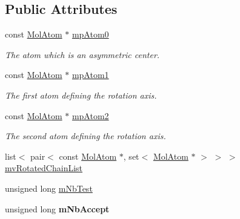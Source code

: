 \subsection*{Public Attributes}
\begin{DoxyCompactItemize}
\item 
\mbox{\label{struct_obj_cryst_1_1_molecule_1_1_flip_group_abb2dfdd1e7967f5963b0fc0fdc079b4f}} 
const \mbox{\hyperlink{class_obj_cryst_1_1_mol_atom}{Mol\+Atom}} $\ast$ \mbox{\hyperlink{struct_obj_cryst_1_1_molecule_1_1_flip_group_abb2dfdd1e7967f5963b0fc0fdc079b4f}{mp\+Atom0}}
\begin{DoxyCompactList}\small\item\em The atom which is an asymmetric center. \end{DoxyCompactList}\item 
\mbox{\label{struct_obj_cryst_1_1_molecule_1_1_flip_group_ae503d7996cce85ae1acc1c4e07773fe6}} 
const \mbox{\hyperlink{class_obj_cryst_1_1_mol_atom}{Mol\+Atom}} $\ast$ \mbox{\hyperlink{struct_obj_cryst_1_1_molecule_1_1_flip_group_ae503d7996cce85ae1acc1c4e07773fe6}{mp\+Atom1}}
\begin{DoxyCompactList}\small\item\em The first atom defining the rotation axis. \end{DoxyCompactList}\item 
\mbox{\label{struct_obj_cryst_1_1_molecule_1_1_flip_group_a3a7b47199e00b11ae9f039221bfd8283}} 
const \mbox{\hyperlink{class_obj_cryst_1_1_mol_atom}{Mol\+Atom}} $\ast$ \mbox{\hyperlink{struct_obj_cryst_1_1_molecule_1_1_flip_group_a3a7b47199e00b11ae9f039221bfd8283}{mp\+Atom2}}
\begin{DoxyCompactList}\small\item\em The second atom defining the rotation axis. \end{DoxyCompactList}\item 
list$<$ pair$<$ const \mbox{\hyperlink{class_obj_cryst_1_1_mol_atom}{Mol\+Atom}} $\ast$, set$<$ \mbox{\hyperlink{class_obj_cryst_1_1_mol_atom}{Mol\+Atom}} $\ast$ $>$ $>$ $>$ \mbox{\hyperlink{struct_obj_cryst_1_1_molecule_1_1_flip_group_a30d77e3abea9f1bb27ffcd92dc1120cc}{mv\+Rotated\+Chain\+List}}
\item 
unsigned long \mbox{\hyperlink{struct_obj_cryst_1_1_molecule_1_1_flip_group_ac957576c4d555f0f32d76fedf11d1c3d}{m\+Nb\+Test}}
\item 
\mbox{\label{struct_obj_cryst_1_1_molecule_1_1_flip_group_a0c6da7db2f88263d66a9fbba4ede927b}} 
unsigned long {\bfseries m\+Nb\+Accept}
\end{DoxyCompactItemize}


